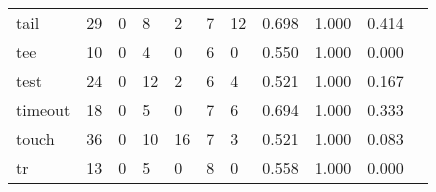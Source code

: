 \begin{longtable}{lp{1.20cm}p{1.20cm}p{1.20cm}p{1.20cm}p{1.20cm}p{1.20cm}p{1.20cm}p{1.20cm}p{1.20cm}p{1.20cm}}
tail      &                                    29 &                                                  0 &                                                  8 &                                                  2 &                                                  7 &                                                 12 &                                         0.698 &                                              1.000 &                                              0.414 \\
tee       &                                    10 &                                                  0 &                                                  4 &                                                  0 &                                                  6 &                                                  0 &                                         0.550 &                                              1.000 &                                              0.000 \\
test      &                                    24 &                                                  0 &                                                 12 &                                                  2 &                                                  6 &                                                  4 &                                         0.521 &                                              1.000 &                                              0.167 \\
timeout   &                                    18 &                                                  0 &                                                  5 &                                                  0 &                                                  7 &                                                  6 &                                         0.694 &                                              1.000 &                                              0.333 \\
touch     &                                    36 &                                                  0 &                                                 10 &                                                 16 &                                                  7 &                                                  3 &                                         0.521 &                                              1.000 &                                              0.083 \\
tr        &                                    13 &                                                  0 &                                                  5 &                                                  0 &                                                  8 &                                                  0 &                                         0.558 &                                              1.000 &                                              0.000 \\

\end{longtable}
